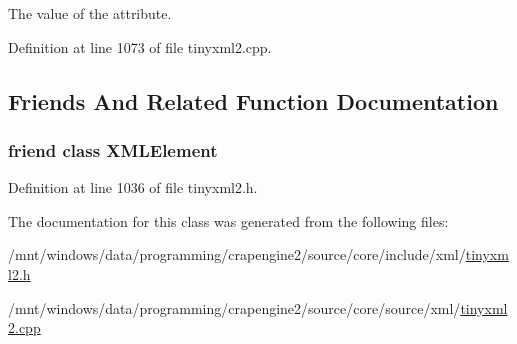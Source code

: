 The value of the attribute. 



Definition at line 1073 of file tinyxml2.\+cpp.



\subsection{Friends And Related Function Documentation}
\hypertarget{classtinyxml2_1_1_x_m_l_attribute_ac2fba9b6e452829dd892f7392c24e0eb}{
\subsubsection[{X\+M\+L\+Element}]{\setlength{\rightskip}{0pt plus 5cm}friend class {\bf X\+M\+L\+Element}\hspace{0.3cm}{\ttfamily [friend]}}}\label{classtinyxml2_1_1_x_m_l_attribute_ac2fba9b6e452829dd892f7392c24e0eb}


Definition at line 1036 of file tinyxml2.\+h.



The documentation for this class was generated from the following files\+:\begin{DoxyCompactItemize}
\item 
/mnt/windows/data/programming/crapengine2/source/core/include/xml/\hyperlink{tinyxml2_8h}{tinyxml2.\+h}\item 
/mnt/windows/data/programming/crapengine2/source/core/source/xml/\hyperlink{tinyxml2_8cpp}{tinyxml2.\+cpp}\end{DoxyCompactItemize}
